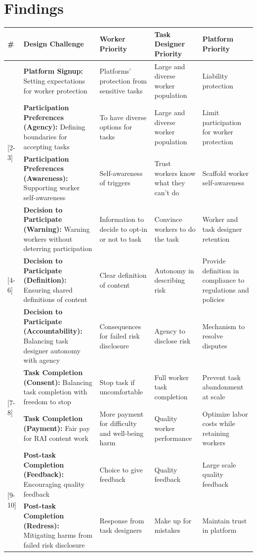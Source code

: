 \section{Findings}
\small
\begin{longtable}{|p{0.6cm}|p{5cm}|p{2.5cm}|p{3cm}|p{2.5cm}|}
\hline
\textbf{\#} & \textbf{Design Challenge} & \textbf{Worker Priority} & \textbf{Task Designer Priority} & \textbf{Platform Priority}\\
\hline
\endhead
[1] & \textbf{Platform Signup:} Setting expectations for worker protection & Platforms' protection from sensitive tasks & Large and diverse worker population & Liability protection \\
\hline
\multirow{2}{*}{[2-3]} & \textbf{Participation Preferences (Agency):} Defining boundaries for accepting tasks & To have diverse options for tasks & Large and diverse worker population & Limit participation for worker protection \\
 & \textbf{Participation Preferences (Awareness):} Supporting worker self-awareness & Self-awareness of triggers & Trust workers know what they can't do & Scaffold worker self-awareness \\
\hline
\multirow{3}{*}{[4-6]} & \textbf{Decision to Participate (Warning):} Warning workers without deterring participation & Information to decide to opt-in or not to task & Convince workers to do the task & Worker and task designer retention \\
 & \textbf{Decision to Participate (Definition):} Ensuring shared definitions of content & Clear definition of content & Autonomy in describing risk & Provide definition in compliance to regulations and policies \\
 & \textbf{Decision to Participate (Accountability):} Balancing task designer autonomy with agency & Consequences for failed risk disclosure & Agency to disclose risk & Mechanism to resolve disputes \\
\hline
\multirow{2}{*}{[7-8]} & \textbf{Task Completion (Consent):} Balancing task completion with freedom to stop & Stop task if uncomfortable & Full worker task completion & Prevent task abandonment at scale \\
 & \textbf{Task Completion (Payment):} Fair pay for RAI content work & More payment for difficulty and well-being harm & Quality worker performance & Optimize labor costs while retaining workers \\
\hline
\multirow{2}{*}{[9-10]} & \textbf{Post-task Completion (Feedback):} Encouraging quality feedback & Choice to give feedback & Quality feedback & Large scale quality feedback \\
& \textbf{Post-task Completion (Redress):} Mitigating harms from failed risk disclosure & Response from task designers & Make up for mistakes & Maintain trust in platform \\
\hline
\end{longtable}
\normalsize


